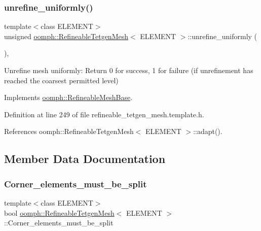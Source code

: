 \subsubsection{\texorpdfstring{unrefine\+\_\+uniformly()}{unrefine\_uniformly()}}
{\footnotesize\ttfamily template$<$class E\+L\+E\+M\+E\+NT$>$ \\
unsigned \hyperlink{classoomph_1_1RefineableTetgenMesh}{oomph\+::\+Refineable\+Tetgen\+Mesh}$<$ E\+L\+E\+M\+E\+NT $>$\+::unrefine\+\_\+uniformly (\begin{DoxyParamCaption}{ }\end{DoxyParamCaption})\hspace{0.3cm}{\ttfamily [inline]}, {\ttfamily [virtual]}}



Unrefine mesh uniformly\+: Return 0 for success, 1 for failure (if unrefinement has reached the coarsest permitted level) 



Implements \hyperlink{classoomph_1_1RefineableMeshBase_a5bbd5c85e7c5c9e75c5a28155ac3f956}{oomph\+::\+Refineable\+Mesh\+Base}.



Definition at line 249 of file refineable\+\_\+tetgen\+\_\+mesh.\+template.\+h.



References oomph\+::\+Refineable\+Tetgen\+Mesh$<$ E\+L\+E\+M\+E\+N\+T $>$\+::adapt().



\subsection{Member Data Documentation}
\mbox{\label{classoomph_1_1RefineableTetgenMesh_a72b505d4bfd018471ef1543e18ae5fce}} 
\subsubsection{\texorpdfstring{Corner\+\_\+elements\+\_\+must\+\_\+be\+\_\+split}{Corner\_elements\_must\_be\_split}}
{\footnotesize\ttfamily template$<$class E\+L\+E\+M\+E\+NT$>$ \\
bool \hyperlink{classoomph_1_1RefineableTetgenMesh}{oomph\+::\+Refineable\+Tetgen\+Mesh}$<$ E\+L\+E\+M\+E\+NT $>$\+::Corner\+\_\+elements\+\_\+must\+\_\+be\+\_\+split\hspace{0.3cm}{\ttfamily [protected]}}



